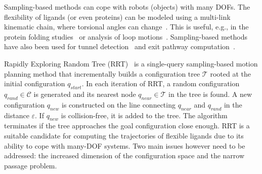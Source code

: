 \documentclass{svmult}
\def\qrand{q_{rand}}
\def\qstart{q_{start}}
\def\qinit{\qstart}
\def\qnear{q_{near}}
\def\qnew{q_{new}}
\def\T{\mathcal{T}}
\def\C{\mathcal{C}}
\begin{document}
Sampling-based methods can cope with robots (objects) with many DOFs. 
The flexibility of ligands (or even proteins) can be modeled using a multi-link kinematic chain, where torsional angles
can change~\cite{songPFpath}.
This is useful, e.g., in the protein folding studies~\cite{al2012motion,gipson2012computational,amato2002using,raveh2009rapid,novinskaya2015improving,songPFintro} or analysis of loop motions~\cite{cortes2004geometric}.
Sampling-based methods have also been used for 
 tunnel detection~\cite{vonasek2016application,vonasek2017tunnel} and
 exit pathway computation~\cite{cortes2010simulating,guieysse2008structure}.

Rapidly Exploring Random Tree (RRT)~\cite{lavalleRRT} is a single-query sampling-based motion planning method that 
incrementally builds a configuration tree $\T$ rooted at the initial configuration $\qinit$.
In each iteration of RRT, a random configuration $\qrand \in \C$ is generated and its nearest node $\qnear \in \T$ in the tree is found.
A new configuration $\qnew$ is constructed on the line connecting $\qnear$ and $\qrand$ in the distance $\varepsilon$.
If $\qnew$ is collision-free, it is added to the tree.
The algorithm terminates if the tree approaches the goal configuration close enough.
RRT is a suitable candidate for computing the trajectories of flexible ligands due to its ability to cope
with many-DOF systems.
Two main issues however need to be addressed: the increased dimension of the configuration space and the narrow passage problem.

\end{document}
